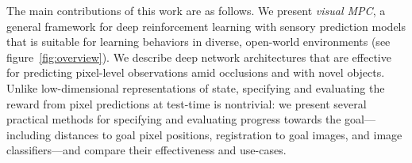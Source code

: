 The main contributions of this work are as follows. We present \emph{visual MPC}, a general framework for deep reinforcement learning with sensory prediction models that is suitable for learning behaviors in diverse, open-world environments (see figure~\ref{fig:overview}).
We describe deep network architectures that are effective for predicting pixel-level observations amid occlusions and with novel objects. Unlike low-dimensional representations of state, specifying and evaluating the reward from pixel predictions at test-time is nontrivial: we present several practical methods for specifying and evaluating progress towards the goal---including distances to goal pixel positions, registration to goal images, and image classifiers---and compare their effectiveness and use-cases.

